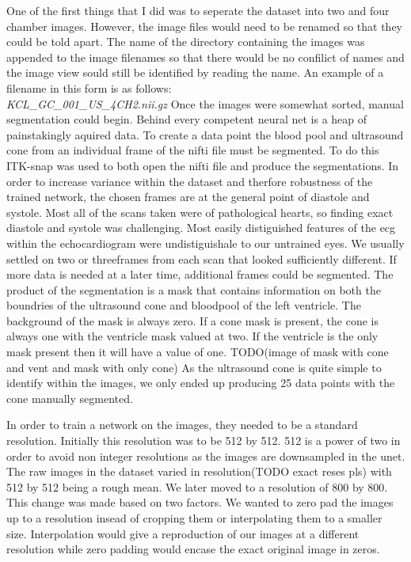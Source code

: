 \documentclass{article}
\begin{document}
One of the first things that I did was to seperate the dataset into two and four chamber images. However, the image files would need to be renamed so that they could be told apart.
The name of the directory containing the images was appended to the image filenames so that there would be no confilict of names and the image view sould still be identified by reading the name.
An example of a filename in this form is as follows:\\
\textit{KCL\_GC\_001\_US\_4CH2.nii.gz}
Once the images were somewhat sorted, manual segmentation could begin. Behind every competent neural net is a heap of painstakingly aquired data.
To create a data point the blood pool and ultrasound cone from an individual frame of the nifti file must be segmented. To do this ITK-snap was used to both open the nifti file and produce the segmentations.
In order to increase variance within the dataset and therfore robustness of the trained network, the chosen frames are at the general point of diastole and systole.
Most all of the scans taken were of pathological hearts, so finding exact diastole and systole was challenging. Most easily distiguished features of the ecg within the echocardiogram were undistiguishale to our untrained eyes.
We usually settled on two or threeframes from each scan that looked sufficiently different.
If more data is needed at a later time, additional frames could be segmented.
The product of the segmentation is a mask that contains information on both the boundries of the ultrasound cone and bloodpool of the left ventricle.
The background of the mask is always zero. If a cone mask is present, the cone is always one with the ventricle mask valued at two.
If the ventricle is the only mask present then it will have a value of one.
TODO(image of mask with cone and vent and mask with only cone)
As the ultrasound cone is quite simple to identify within the images, we only ended up producing 25 data points with the cone manually segmented.
\par{}
In order to train a network on the images, they needed to be a standard resolution.
Initially this resolution was to be 512 by 512. 512 is a power of two in order to avoid non integer resolutions as the images are downsampled in the unet.
The raw images in the dataset varied in resolution(TODO exact reses pls) with 512 by 512 being a rough mean.
We later moved to a resolution of 800 by 800. This change was made based on two factors. 
We wanted to zero pad the images up to a resolution insead of cropping them or interpolating them to a smaller size.
Interpolation would give a reproduction of our images at a different resolution  while zero padding would encase the exact original image in zeros.
\end{document}
